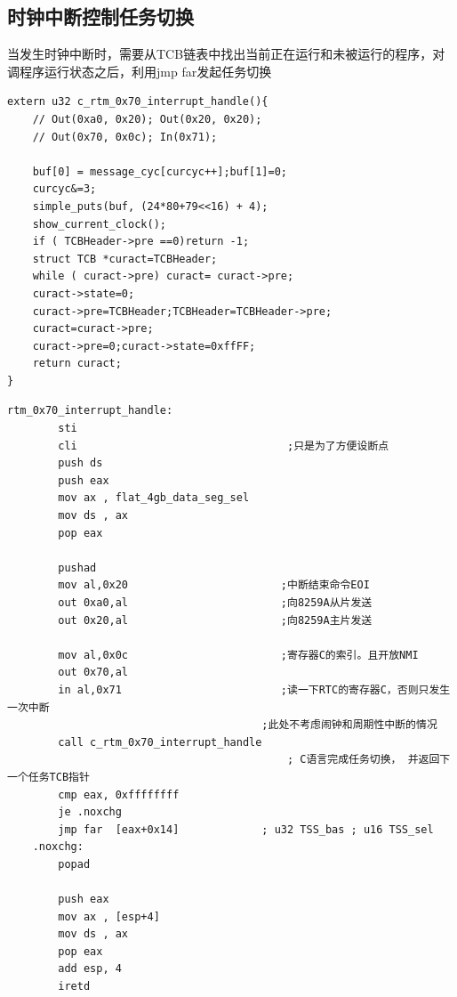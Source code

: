 \documentclass[a4paper,11pt,UTF8]{ctexart}
\begin{document}
	
	\begin{lstlisting}[language=={[x86masm]Assembler}keywordstyle=\color{blue!70},commentstyle=\color{red!50!green!50!blue!50},frame=shadowbox, rulesepcolor=\color{red!20!green!20!blue!20}]
	\end{lstlisting}

	\subsection{时钟中断控制任务切换}
	当发生时钟中断时，需要从TCB链表中找出当前正在运行和未被运行的程序，对调程序运行状态之后，利用jmp far发起任务切换
	\begin{lstlisting}[language={[ANSI]C},keywordstyle=\color{blue!70},commentstyle=\color{red!50!green!50!blue!50},frame=shadowbox, rulesepcolor=\color{red!20!green!20!blue!20}]
extern u32 c_rtm_0x70_interrupt_handle(){
	// Out(0xa0, 0x20); Out(0x20, 0x20);
	// Out(0x70, 0x0c); In(0x71);

	buf[0] = message_cyc[curcyc++];buf[1]=0;
	curcyc&=3;
	simple_puts(buf, (24*80+79<<16) + 4);
	show_current_clock();
	if ( TCBHeader->pre ==0)return -1;
	struct TCB *curact=TCBHeader;
	while ( curact->pre) curact= curact->pre;
	curact->state=0;
	curact->pre=TCBHeader;TCBHeader=TCBHeader->pre;
	curact=curact->pre;
	curact->pre=0;curact->state=0xffFF;
	return curact;
}
	\end{lstlisting}
	
	\begin{lstlisting}[language=={[x86masm]Assembler}keywordstyle=\color{blue!70},commentstyle=\color{red!50!green!50!blue!50},frame=shadowbox, rulesepcolor=\color{red!20!green!20!blue!20}]
		rtm_0x70_interrupt_handle:
		sti
		cli									;只是为了方便设断点
		push ds
		push eax
		mov ax , flat_4gb_data_seg_sel
		mov ds , ax
		pop eax

		pushad
		mov al,0x20                        ;中断结束命令EOI
		out 0xa0,al                        ;向8259A从片发送
		out 0x20,al                        ;向8259A主片发送

		mov al,0x0c                        ;寄存器C的索引。且开放NMI
		out 0x70,al
		in al,0x71                         ;读一下RTC的寄存器C，否则只发生一次中断
										;此处不考虑闹钟和周期性中断的情况
		call c_rtm_0x70_interrupt_handle
											; C语言完成任务切换， 并返回下一个任务TCB指针
		cmp eax, 0xffffffff
		je .noxchg
		jmp far  [eax+0x14]				; u32 TSS_bas ; u16 TSS_sel
	.noxchg:
		popad

		push eax
		mov ax , [esp+4]
		mov ds , ax
		pop eax
		add esp, 4
		iretd

	\end{lstlisting}
	
\end{document}
